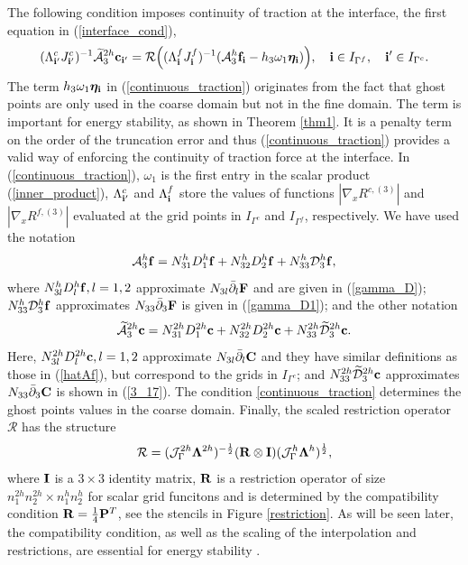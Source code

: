 The following condition imposes continuity of traction at the interface, the first equation in (\ref{interface_cond}),
\begin{equation}\label{continuous_traction}
(\Lambda^{c}_{{\bf i}'}J_{{\bf i}'}^{c})^{-1}\wt{\mathcal{A}}_3^{2h}{\bf c}_{{\bf i}'}
= {\mathcal{R}}\Big((\Lambda^f_{\bf i}{ J}^f_{\bf i})^{-1}(\mathcal{A}_3^h{\bf f}_{\bf i}-h_3\omega_1{\bm \eta}_{\bf i})\Big), \quad {\bf i}\in I_{\Gamma^f},\quad {{\bf i}'}\in I_{\Gamma^c}.
\end{equation}
The term $h_3\omega_1{\bm \eta}_{\bf i}$ in (\ref{continuous_traction}) originates from the fact that ghost points are only used in the coarse domain but not in the fine domain. The term is important for energy stability, as shown in Theorem \ref{thm1}. It is a penalty term on the order of the truncation error and thus (\ref{continuous_traction})  provides a valid way of enforcing the continuity of traction force at the interface.  In (\ref{continuous_traction}), $\omega_1$ is the first entry in the scalar product (\ref{inner_product}), $\Lambda_{{\bf i}'}^c$ and $\Lambda_{\bf i}^f$ store the values of functions $|\nabla_x R^{c,(3)}|$ and $|\nabla_x R^{f,(3)}|$ evaluated at the grid points in $I_{\Gamma^c}$ and $I_{\Gamma^f}$, respectively. We have used the notation
\begin{equation}\label{hatAf}
\mathcal{A}_3^h{\bf f} = {N}_{31}^{h}{D}^h_1{\bf f} + {N}_{32}^h{D}^h_2{\bf f} + {N}_{33}^h\mathcal{D}_3^h{\bf f},
\end{equation}
where ${N}_{3l}^hD_l^h{\bf f}, l = 1,2$ approximate $N_{3l}\bar{\partial}_l{\bf F}$ and are given in (\ref{gamma_D}); ${N}_{33}^h\mathcal{D}_3^h{\bf f}$ approximates $N_{33}\bar{\partial}_3{\bf F}$ is given in (\ref{gamma_D1}); and the other notation 
\begin{equation}\label{hatAc}
\wt{\mathcal{A}}_3^{2h}{\bf c} = {N}_{31}^{2h}{D}^{2h}_1{\bf c} + {N}_{32}^{2h}{D}^{2h}_2{\bf c} + {N}_{33}^{2h}\wt{\mathcal{D}}^{2h}_3{\bf c}.
\end{equation}
Here, ${N}_{3l}^{2h}D_l^{2h}{\bf c}, l = 1,2$ approximate $N_{3l}\bar{\partial}_l{\bf C}$ and they have similar definitions as those in (\ref{hatAf}), but correspond to the grids in $I_{\Gamma^c}$; and ${N}_{33}^{2h}\widetilde{\mathcal{D}}^{2h}_3{\bf c}$ approximates $N_{33}\bar{\partial}_3{\bf C}$ is shown in (\ref{3_17}). The condition \eqref{continuous_traction} determines the ghost points values in the coarse domain. Finally, the scaled restriction operator ${\mathcal{R}} $ has the structure 
 \[{\mathcal{R}} =  (\mathcal{J}^{2h}_\Gamma \bm{\Lambda}^{2h})^{-\frac{1}{2}}({\bf R}\otimes{\bf I})(\mathcal{J}^{h}_\Gamma \bm{\Lambda}^h)^{\frac{1}{2}},\]
 where ${\bf I}$ is a $3\times3$ identity matrix, ${\bf R}$ is {\color{red} a restriction operator of size $n_1^{2h}n_2^{2h}\times n_1^hn_2^h$ for scalar grid funcitons} and is determined by the compatibility condition ${\bf R}=\frac{1}{4}{\bf P}^T$, see the stencils in Figure \ref{restriction}. As will be seen later, the compatibility condition, as well as the scaling of the interpolation and restrictions, are essential for energy stability \cite{Lundquist2018}.
 
